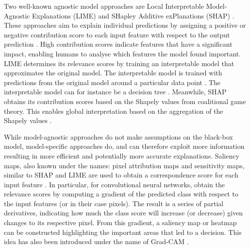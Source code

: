 Two well-known agnostic model approaches are Local Interpretable Model-Agnostic Explanations (LIME) and SHapley Additive exPlanations (SHAP) \citep{ribeiroWhyShouldTrust2016, lundbergUnifiedApproachInterpreting2017}. These approaches aim to explain individual predictions by assigning a positive or negative contribution score to each input feature with respect to the output prediction \cite{lundbergUnifiedApproachInterpreting2017, molnarInterpretableMachineLearning2022}. High contribution scores indicate features that have a significant impact, enabling humans to analyse which features the model found important. LIME determines its relevance scores by training an interpretable model that approximates the original model. The interpretable model is trained with predictions from the original model around a particular data point \citep{ribeiroWhyShouldTrust2016}. The interpretable model can for instance be a decision tree \citep{molnarInterpretableMachineLearning2022}. Meanwhile, SHAP obtains its contribution scores based on the Shapely values from coalitional game theory. This enables global interpretation based on the aggregation of the Shapely values \citep{molnarInterpretableMachineLearning2022}.

While model-agnostic approaches do not make assumptions on the black-box model, model-specific approaches do, and can therefore exploit more information resulting in more efficient and potentially more accurate explanations. Saliency maps, also known under the names: pixel attribution maps and sensitivity maps, similar to SHAP and LIME are used to obtain a correspondence score for each input feature \citep{molnarInterpretableMachineLearning2022}. In particular, for convolutional neural networks, \cite{simonyanDeepConvolutionalNetworks2014} obtain the relevance scores by computing a gradient of the predicted class with respect to the input features (or in their case pixels). The result is a series of partial derivatives, indicating how much the class score will increase (or decrease) given changes to its respective pixel. From this gradient, a saliency map or heatmap can be constructed highlighting the important areas that led to a decision. This idea has also been introduced under the name of Grad-CAM \citep{selvarajuGradCAMVisualExplanations2020}. 

